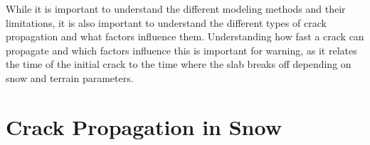   
  While it is important to understand the different modeling methods and their limitations, it is also important to understand the different types of crack propagation and what factors influence them. Understanding how fast a crack can propagate and which factors influence this is important for warning, as it relates the time of the initial crack to the time where the slab breaks off depending on snow and terrain parameters.  \par

  \section{Crack Propagation in Snow}
